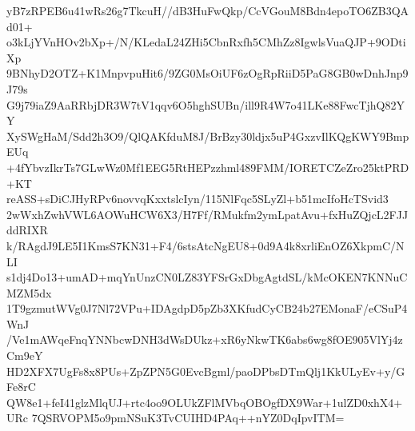 yB7zRPEB6u41wRs26g7TkcuH//dB3HuFwQkp/CcVGouM8Bdn4epoTO6ZB3QAd01+
o3kLjYVnHOv2bXp+/N/KLedaL24ZHi5CbnRxfh5CMhZz8IgwlsVuaQJP+9ODtiXp
9BNhyD2OTZ+K1MnpvpuHit6/9ZG0MsOiUF6zOgRpRiiD5PaG8GB0wDnhJnp9J79s
G9j79iaZ9AaRRbjDR3W7tV1qqv6O5hghSUBn/ill9R4W7o41LKe88FwcTjhQ82YY
XySWgHaM/Sdd2h3O9/QlQAKfduM8J/BrBzy30ldjx5uP4GxzvIlKQgKWY9BmpEUq
+4fYbvzIkrTs7GLwWz0Mf1EEG5RtHEPzzhml489FMM/IORETCZeZro25ktPRD+KT
reASS+sDiCJHyRPv6novvqKxxtslcIyn/115NlFqc5SLyZl+b51mcIfoHcTSvid3
2wWxhZwhVWL6AOWuHCW6X3/H7Ff/RMukfm2ymLpatAvu+fxHuZQjcL2FJJddRIXR
k/RAgdJ9LE5I1KmsS7KN31+F4/6stsAtcNgEU8+0d9A4k8xrliEnOZ6XkpmC/NLI
s1dj4Do13+umAD+mqYnUnzCN0LZ83YFSrGxDbgAgtdSL/kMcOKEN7KNNuCMZM5dx
1T9gzmutWVg0J7Nl72VPu+IDAgdpD5pZb3XKfudCyCB24b27EMonaF/eCSuP4WnJ
/Ve1mAWqeFnqYNNbcwDNH3dWsDUkz+xR6yNkwTK6abs6wg8fOE905VlYj4zCm9eY
HD2XFX7UgFs8x8PUs+ZpZPN5G0EvcBgml/paoDPbsDTmQlj1KkULyEv+y/GFe8rC
QW8e1+feI41glzMlqUJ+rtc4oo9OLUkZFlMVbqOBOgfDX9War+1ulZD0xhX4+URc
7QSRVOPM5o9pmNSuK3TvCUIHD4PAq++nYZ0DqIpvITM=
